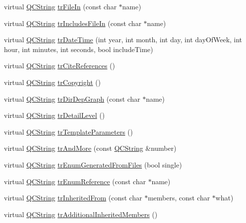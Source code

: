 \begin{DoxyCompactItemize}
virtual \hyperlink{class_q_c_string}{Q\-C\-String} \hyperlink{class_translator_polish_acf964d17bad4c55c393193fe9708575f}{tr\-File\-In} (const char $\ast$name)
\item 
virtual \hyperlink{class_q_c_string}{Q\-C\-String} \hyperlink{class_translator_polish_a53f57c6e2aa0b9dc09bc47b3746d3481}{tr\-Includes\-File\-In} (const char $\ast$name)
\item 
virtual \hyperlink{class_q_c_string}{Q\-C\-String} \hyperlink{class_translator_polish_a19c43671f677ae0445fca1fe7a5f62cc}{tr\-Date\-Time} (int year, int month, int day, int day\-Of\-Week, int hour, int minutes, int seconds, bool include\-Time)
\item 
virtual \hyperlink{class_q_c_string}{Q\-C\-String} \hyperlink{class_translator_polish_ae43b2c6dbb1637144e32cd13a0d4704c}{tr\-Cite\-References} ()
\item 
virtual \hyperlink{class_q_c_string}{Q\-C\-String} \hyperlink{class_translator_polish_a840474c30dfc2d4e92d1a29c5d1bf343}{tr\-Copyright} ()
\item 
virtual \hyperlink{class_q_c_string}{Q\-C\-String} \hyperlink{class_translator_polish_abbe522be6eed72f54409458a1896323c}{tr\-Dir\-Dep\-Graph} (const char $\ast$name)
\item 
virtual \hyperlink{class_q_c_string}{Q\-C\-String} \hyperlink{class_translator_polish_a138b581235bf64a0338ed25ee0d1ad61}{tr\-Detail\-Level} ()
\item 
virtual \hyperlink{class_q_c_string}{Q\-C\-String} \hyperlink{class_translator_polish_ad9599164391093757c91bbe746f694a5}{tr\-Template\-Parameters} ()
\item 
virtual \hyperlink{class_q_c_string}{Q\-C\-String} \hyperlink{class_translator_polish_a391327398836ee03f1d00415b80cb997}{tr\-And\-More} (const \hyperlink{class_q_c_string}{Q\-C\-String} \&number)
\item 
virtual \hyperlink{class_q_c_string}{Q\-C\-String} \hyperlink{class_translator_polish_a2039b9a9624800366462f980e8ebce70}{tr\-Enum\-Generated\-From\-Files} (bool single)
\item 
virtual \hyperlink{class_q_c_string}{Q\-C\-String} \hyperlink{class_translator_polish_a0209ef4cc7768fc9abf62f7ffc95534e}{tr\-Enum\-Reference} (const char $\ast$name)
\item 
virtual \hyperlink{class_q_c_string}{Q\-C\-String} \hyperlink{class_translator_polish_af8b8b1bb56a7ea74b11dad76e644968e}{tr\-Inherited\-From} (const char $\ast$members, const char $\ast$what)
\item 
virtual \hyperlink{class_q_c_string}{Q\-C\-String} \hyperlink{class_translator_polish_a62da1a83afa60109108fba6ad327a06f}{tr\-Additional\-Inherited\-Members} ()
\end{DoxyCompactItemize}
